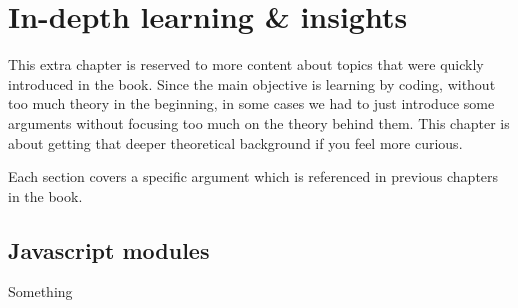 %
%
%

\chapter[Solutions]{In-depth learning \& insights}
\label{sec:indepthlearn}

This extra chapter is reserved to more content about topics that were quickly introduced in the book.
Since the main objective is learning by coding, without too much theory in the beginning, in
some cases we had to just introduce some arguments without focusing too much on the theory behind
them. This chapter is about getting that deeper theoretical background if you feel more curious.

Each section covers a specific argument which is referenced in previous chapters in the book.

\section{Javascript modules}
\label{sec:learn:jsmodules}
Something
